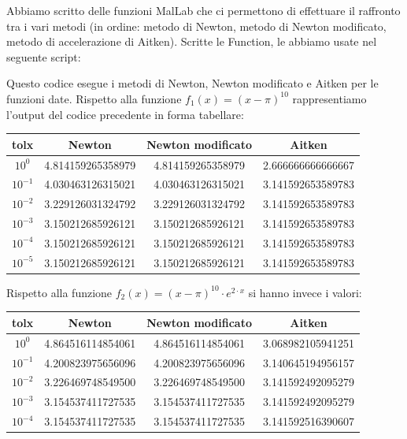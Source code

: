 \begin{flushleft}
Abbiamo scritto delle funzioni MalLab che ci permettono di effettuare il raffronto tra i vari metodi (in ordine: metodo di Newton, metodo di Newton modificato, metodo di accelerazione di Aitken). Scritte le Function, le abbiamo usate nel seguente script: 




Questo codice esegue i metodi di Newton, Newton modificato e Aitken per le funzioni date. Rispetto alla funzione $f_1(x)=(x-\pi)^{10}$ rappresentiamo l'output del codice precedente in forma tabellare: 
\begin{center}
\begin{tabular}{|c|c|c|c|}
\hline
tolx & Newton & Newton modificato & Aitken \\
\hline
$10^{0}$ & 4.814159265358979 & 4.814159265358979 & 2.666666666666667 \\
$10^{-1}$ & 4.030463126315021 & 4.030463126315021 & 3.141592653589783 \\
$10^{-2}$ & 3.229126031324792 & 3.229126031324792 & 3.141592653589783 \\
$10^{-3}$ & 3.150212685926121 &  3.150212685926121 &  3.141592653589783 \\ 
$10^{-4}$ & 3.150212685926121 & 3.150212685926121 & 3.141592653589783 \\
$10^{-5}$ & 3.150212685926121 & 3.150212685926121 & 3.141592653589783 \\
\hline
\end{tabular}
\end{center}
Rispetto alla funzione $f_2(x) = (x-\pi)^{10} \cdot e^{2\cdot x}$ si hanno invece i valori:
\begin{center}
\begin{tabular}{|c|c|c|c|}
\hline
tolx & Newton & Newton modificato & Aitken \\
\hline
$10^{0}$ & 4.864516114854061 & 4.864516114854061 & 3.068982105941251 \\
$10^{-1}$ & 4.200823975656096 & 4.200823975656096 & 3.140645194956157 \\
$10^{-2}$ & 3.226469748549500 & 3.226469748549500 & 3.141592492095279 \\
$10^{-3}$ & 3.154537411727535 & 3.154537411727535 &  3.141592492095279 \\ 
$10^{-4}$ & 3.154537411727535 & 3.154537411727535 & 3.141592516390607 \\

\end{tabular}
\end{center}
\end{flushleft}

